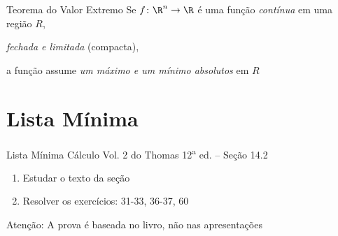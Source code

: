 \documentclass[fleqn,utf8,aspectratio=169,12pt,ignorenonframetext]{beamer}
\begin{document}
\begin{frame}{Teorema do Valor Extremo}
  Se \(f\colon\R^n\to\R\) é uma função \emph{contínua}
  em uma região $R$,

  \pause
  \emph{fechada e limitada} (compacta),

  \pause
  a função assume \emph{um máximo e um mínimo absolutos} em $R$
\end{frame}

\section{Lista Mínima}

\begin{frame}{Lista Mínima}
  Cálculo Vol. 2 do Thomas 12\textsuperscript{a} ed. -- Seção 14.2
  \begin{enumerate}
    \item Estudar o texto da seção
    \item Resolver os exercícios: 31-33, 36-37, 60
  \end{enumerate}

  \vfill
  Atenção: A prova é baseada no livro, não nas apresentações
\end{frame}

\end{document}
